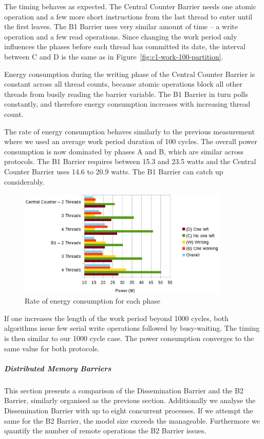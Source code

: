 \documentclass[a4paper, 10pt]{article}
\begin{document}
The timing behaves as expected. The Central Counter Barrier needs one atomic operation and a few more short instructions from the last thread to enter until the first leaves. The B1 Barrier uses very similar amount of time -- a write operation and a few read operations.
Since changing the work period only influences the phases before each thread has committed its date, the interval between C and D is the same as in Figure~\ref{fig:c1-work-100-partition}.

Energy consumption during the writing phase of the Central Counter Barrier is constant across all thread counts, because atomic operations block all other threads from busily reading the barrier variable.
The B1 Barrier in turn polls constantly, and therefore energy consumption increases with increasing thread count.

The rate of energy consumption behaves similarly to the previous measurement where we used an average work period duration of 100 cycles.
The overall power consumption is now dominated by phases A and B, which are similar across protocols. The B1 Barrier requires between 15.3 and 23.5 watts and the Central Counter Barrier uses 14.6 to 20.9 watts. The B1 Barrier can catch up considerably.
\begin{figure}[htbp]
	\centering
	\includegraphics[width=10cm]{charts/c1-power-work-1000}
	\caption{Rate of energy consumption for each phase}
	\label{fig:c1-power-work-1000}
\end{figure}

If one increases the length of the work period beyond 1000 cycles, both algorithms issue few serial write operations followed by busy-waiting. The timing is then similar to our 1000 cycle case. The power consumption converges to the same value for both protocols.

\subparagraph{Distributed Memory Barriers}
\label{sssssec:analysis-modelchecking-quantitative-properties-evaluation-distributed}
This section presents a comparison of the Dissemination Barrier and the B2 Barrier, similarly organised as the previous section.
Additionally we analyse the Dissemination Barrier with up to eight concurrent processes.
If we attempt the same for the B2 Barrier, the model size exceeds the manageable.
Furthermore we quantify the number of remote operations the B2 Barrier issues.
\end{document}
